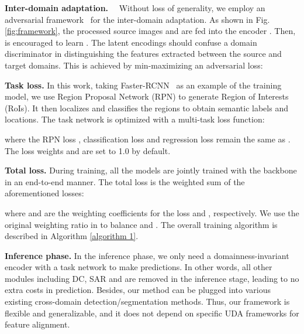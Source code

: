 \documentclass[10pt,journal,compsoc]{IEEEtran}
\renewcommand{\paragraph}[1]{\noindent\textbf{#1}~~}
\begin{document}
\paragraph{Inter-domain adaptation.}
Without loss of generality, we employ an adversarial framework~\cite{DANN} for the inter-domain adaptation. As shown in Fig. \ref{fig:framework}, the processed source images  and  are fed into the encoder . Then,  is encouraged to learn . The latent encodings should confuse a domain discriminator  in distinguishing the features extracted between the source and target domains. This is achieved by min-maximizing an adversarial loss: 






\noindent \textbf{Task loss.} In this work, taking Faster-RCNN~\cite{ren2015faster} as an example of the training model, we use Region Proposal Network (RPN) to generate Region of Interests (RoIs). It then localizes and classifies the regions to obtain semantic labels and locations. The task network is optimized with a multi-task loss function:

where the RPN loss , classification loss  and regression loss  remain the same as \cite{ren2015faster}. The
loss weights  and  are set to 1.0 by default.

\noindent \textbf{Total loss.} During training, all the models are jointly trained with the backbone in an end-to-end manner. The total loss  is the weighted sum
of the aforementioned losses:

where  and  are the weighting coefficients for the loss  and , respectively. We use the original weighting ratio in \cite{DA-Faster-RCNN,SWDA,SCL,GPA,AdaptSegNet,CLAN,SIM} to balance  and .  The overall training algorithm is described in Algorithm \ref{algorithm 1}.

\noindent \textbf{Inference phase.} In the inference phase, we only need a domainness-invariant encoder  with a task network  to make predictions. In other words, all other modules including DC, SAR and  are removed in the inference stage, leading to no extra costs in prediction.  Besides, our method can be plugged into various existing cross-domain detection/segmentation methods.  Thus, our framework is flexible and generalizable, and it does not depend on specific UDA frameworks for feature alignment.
\end{document}
